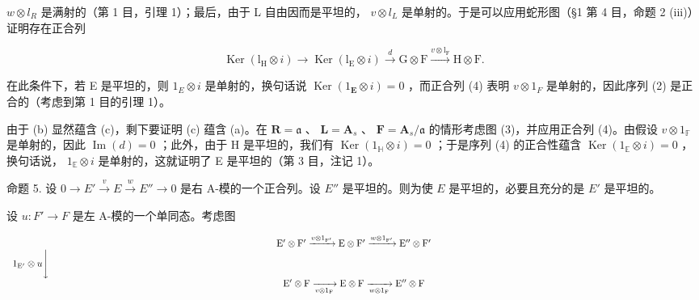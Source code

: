 \(w \otimes l_{R}\) 是满射的（第 1 目，引理 1）；最后，由于 L 自由因而是平坦的， \(v \otimes l_{L}\) 是单射的。于是可以应用蛇形图（§1 第 4 目，命题 2 (iii)）证明存在正合列

\[
\operatorname{Ker} \left(\mathrm{l} _ {\mathrm{H}} \otimes i\right) \longrightarrow \operatorname{Ker} \left(\mathrm{l} _ {\mathrm{E}} \otimes i\right) \xrightarrow {d} \mathrm{G} \otimes \mathrm{F} \xrightarrow {v \otimes \mathrm{l} _ {\mathrm{F}}} \mathrm{H} \otimes \mathrm{F}.\tag{4}
\]

在此条件下，若 E 是平坦的，则 \(1_{E} \otimes i\) 是单射的，换句话说 \(\operatorname{Ker}(1_{\mathbf{E}} \otimes i) = 0\) ，而正合列 (4) 表明 \(v \otimes 1_{F}\) 是单射的，因此序列 (2) 是正合的（考虑到第 1 目的引理 1）。

由于 (b) 显然蕴含 (c)，剩下要证明 (c) 蕴含 (a)。在 \(\mathbf{R} = \mathfrak{a}\) 、 \(\mathbf{L} = \mathbf{A}_s\) 、 \(\mathbf{F} = \mathbf{A}_s / \mathfrak{a}\) 的情形考虑图 (3)，并应用正合列 (4)。由假设 \(v \otimes 1_{\mathbb{F}}\) 是单射的，因此 \(\operatorname{Im}(d) = 0\) ；此外，由于 H 是平坦的，我们有 \(\operatorname{Ker}(1_{\mathbb{H}} \otimes i) = 0\) ；于是序列 (4) 的正合性蕴含 \(\operatorname{Ker}(1_{\mathbb{E}} \otimes i) = 0\) ，换句话说， \(1_{\mathbb{E}} \otimes i\) 是单射的，这就证明了 E 是平坦的（第 3 目，注记 1）。

命题 5. 设 \(0 \to E' \xrightarrow{v} E \xrightarrow{w} E'' \to 0\) 是右 A-模的一个正合列。设 \(E''\) 是平坦的。则为使 \(E\) 是平坦的，必要且充分的是 \(E'\) 是平坦的。

设 \(u: F' \to F\) 是左 A-模的一个单同态。考虑图

\[
\begin{array}{c} \mathrm{E} ^ {\prime} \otimes \mathrm{F} ^ {\prime} \xrightarrow {v \otimes 1 _ {\mathrm{F} ^ {\prime}}} \mathrm{E} \otimes \mathrm{F} ^ {\prime} \xrightarrow {w \otimes 1 _ {\mathrm{F} ^ {\prime}}} \mathrm{E} ^ {\prime \prime} \otimes \mathrm{F} ^ {\prime} \\ 1 _ {\mathrm{E} ^ {\prime}} \otimes u \Bigg \downarrow \qquad \qquad \qquad \qquad \qquad \qquad \qquad \qquad \qquad \qquad \qquad \qquad \qquad \qquad \qquad \qquad \qquad \qquad \qquad \qquad \qquad \qquad \qquad \qquad \qquad \qquad \qquad \qquad \qquad \qquad \qquad \qquad \qquad \qquad \\ \mathrm{E} ^ {\prime} \otimes \mathrm{F} \xrightarrow [ v \otimes 1 _ {\mathrm{F}} ]{} \mathrm{E} \otimes \mathrm{F} \xrightarrow [ w \otimes 1 _ {\mathrm{F}} ]{} \mathrm{E} ^ {\prime \prime} \otimes \mathrm{F} \end{array}
\]

